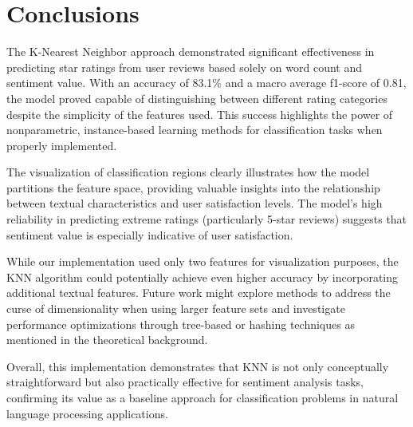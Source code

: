 \documentclass[10pt]{article}
\begin{document}
\section{Conclusions}
The K-Nearest Neighbor approach demonstrated significant effectiveness in predicting star ratings from user reviews based solely on word count and sentiment value. With an accuracy of 83.1\% and a macro average f1-score of 0.81, the model proved capable of distinguishing between different rating categories despite the simplicity of the features used. This success highlights the power of nonparametric, instance-based learning methods for classification tasks when properly implemented. \par
The visualization of classification regions clearly illustrates how the model partitions the feature space, providing valuable insights into the relationship between textual characteristics and user satisfaction levels. The model's high reliability in predicting extreme ratings (particularly 5-star reviews) suggests that sentiment value is especially indicative of user satisfaction. \par
While our implementation used only two features for visualization purposes, the KNN algorithm could potentially achieve even higher accuracy by incorporating additional textual features. Future work might explore methods to address the curse of dimensionality when using larger feature sets and investigate performance optimizations through tree-based or hashing techniques as mentioned in the theoretical background. \par
Overall, this implementation demonstrates that KNN is not only conceptually straightforward but also practically effective for sentiment analysis tasks, confirming its value as a baseline approach for classification problems in natural language processing applications.



\end{document}
